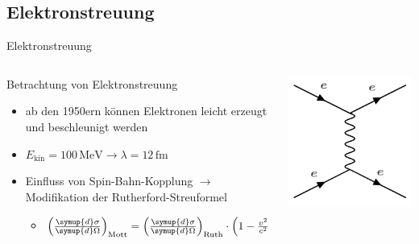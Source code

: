 \documentclass[aspectratio=1610, 9pt]{beamer}
\begin{document}
\subsection{Elektronstreuung}
\begin{frame}{Elektronstreuung}
  \begin{columns}
    \begin{column}{0.6\textwidth}
  Betrachtung von Elektronstreuung
      \begin{itemize}
        \item{ab den 1950ern können Elektronen leicht erzeugt und beschleunigt werden}
        \item{$E_\text{kin} = 100 \,\mathrm{MeV} \rightarrow \lambda = 12\,\mathrm{fm} $}
        \item{Einfluss von Spin-Bahn-Kopplung $\rightarrow$ Modifikation der Rutherford-Streuformel}
      \begin{itemize}
         \item{$ \left( \frac{\symup{d} \sigma}{\symup{d} \Omega } \right)_\text{Mott} = \left( \frac{\symup{d} \sigma}{\symup{d} \Omega } \right)_\text{Ruth} \cdot \left( 1-\frac{v^2}{c^2} \sin^2{ \frac{\vartheta}{2} } \right) $}
      \end{itemize}
      \end{itemize}
    \end{column}

  \begin{column}{0.4\textwidth}
    \includegraphics[scale=0.3]{images/ee-scattering.png}
  \end{column}

  \end{columns}
\end{frame}
\end{document}
